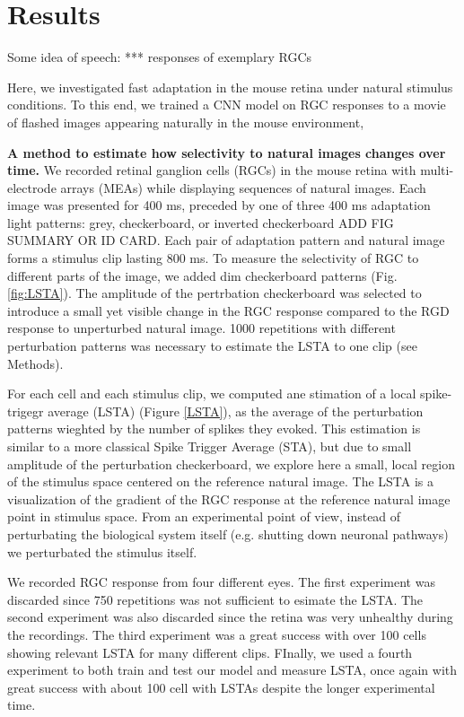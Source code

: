 \section{Results}
\label{sec:results}
Some idea of speech: *** responses of exemplary RGCs

Here, we investigated fast adaptation in the mouse retina under natural
stimulus conditions. To this end, we trained a CNN model on RGC responses to a
movie of flashed images appearing naturally in the mouse environment, %

\textbf{A method to estimate how selectivity to natural images changes over time.}
We recorded retinal ganglion cells (RGCs) in the mouse retina with multi-electrode arrays (MEAs) while displaying sequences of natural images.
Each image was presented for 400 ms, preceded by one of three 400 ms adaptation light patterns: grey, checkerboard, or inverted checkerboard ADD FIG SUMMARY OR ID CARD.
Each pair of adaptation pattern and natural image forms a stimulus clip lasting 800 ms.
To measure the selectivity of RGC to different parts of the image, we added dim checkerboard patterns (Fig. \ref{fig:LSTA}).
The amplitude of the pertrbation checkerboard was selected to introduce a small yet visible change in the RGC response compared to the RGD response to unperturbed natural image.
1000 repetitions with different perturbation patterns was necessary to estimate the LSTA to one clip (see Methods).

For each cell and each stimulus clip, we computed ane stimation of a local
spike-trigegr average (LSTA) (Figure \ref{LSTA}), as the average of the
perturbation patterns wieghted by the number of splikes they evoked. This
estimation is similar to a more classical Spike Trigger Average (STA), but due
to small amplitude of the perturbation checkerboard, we explore here a small,
local region of the stimulus space centered on the reference natural image. The
LSTA is a visualization of the gradient of the RGC response at the reference
natural image point in stimulus space. From an experimental point of view,
instead of perturbating the biological system itself (e.g. shutting down
neuronal pathways) we perturbated the stimulus itself.

We recorded RGC response from four different eyes. The first experiment was
discarded since 750 repetitions was not sufficient to esimate the LSTA. The
second experiment was also discarded since the retina was very unhealthy during
the recordings. The third experiment was a great success with over 100 cells
showing relevant LSTA for many different clips. FInally, we used a fourth
experiment to both train and test our model and measure LSTA, once again with
great success with about 100 cell with LSTAs despite the longer experimental
time.

